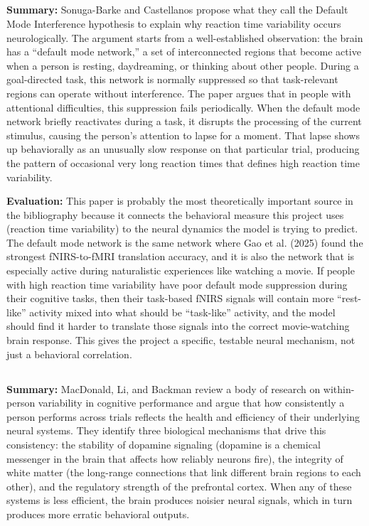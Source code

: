 \documentclass[12pt]{article}
\begin{document}
\subsection*{\cite{sonugabarke2007}}
\textbf{Summary:} Sonuga-Barke and Castellanos propose what they call the Default Mode Interference hypothesis to explain why reaction time variability occurs neurologically. The argument starts from a well-established observation: the brain has a ``default mode network,'' a set of interconnected regions that become active when a person is resting, daydreaming, or thinking about other people. During a goal-directed task, this network is normally suppressed so that task-relevant regions can operate without interference. The paper argues that in people with attentional difficulties, this suppression fails periodically. When the default mode network briefly reactivates during a task, it disrupts the processing of the current stimulus, causing the person's attention to lapse for a moment. That lapse shows up behaviorally as an unusually slow response on that particular trial, producing the pattern of occasional very long reaction times that defines high reaction time variability.

\textbf{Evaluation:} This paper is probably the most theoretically important source in the bibliography because it connects the behavioral measure this project uses (reaction time variability) to the neural dynamics the model is trying to predict. The default mode network is the same network where Gao et al. (2025) found the strongest fNIRS-to-fMRI translation accuracy, and it is also the network that is especially active during naturalistic experiences like watching a movie. If people with high reaction time variability have poor default mode suppression during their cognitive tasks, then their task-based fNIRS signals will contain more ``rest-like'' activity mixed into what should be ``task-like'' activity, and the model should find it harder to translate those signals into the correct movie-watching brain response. This gives the project a specific, testable neural mechanism, not just a behavioral correlation.

\subsection*{\cite{macdonald2009}}
\textbf{Summary:} MacDonald, Li, and Backman review a body of research on within-person variability in cognitive performance and argue that how consistently a person performs across trials reflects the health and efficiency of their underlying neural systems. They identify three biological mechanisms that drive this consistency: the stability of dopamine signaling (dopamine is a chemical messenger in the brain that affects how reliably neurons fire), the integrity of white matter (the long-range connections that link different brain regions to each other), and the regulatory strength of the prefrontal cortex. When any of these systems is less efficient, the brain produces noisier neural signals, which in turn produces more erratic behavioral outputs.
\end{document}
